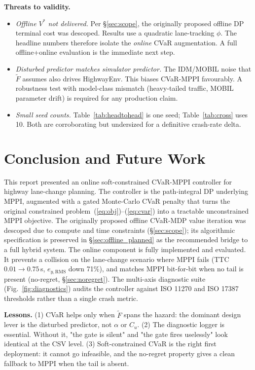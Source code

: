 \documentclass[letterpaper, 10 pt, conference]{ieeeconf}
\begin{document}
\textbf{Threats to validity.}
\begin{itemize}
    \item \textit{Offline $V^*$ not delivered.} Per \S\ref{sec:scope}, the originally proposed offline DP terminal cost was descoped. Results use a quadratic lane-tracking $\phi$. The headline numbers therefore isolate the \emph{online} CVaR augmentation. A full offline+online evaluation is the immediate next step.
    \item \textit{Disturbed predictor matches simulator predictor.} The IDM/MOBIL noise that $\tilde{F}$ assumes also drives HighwayEnv. This biases CVaR-MPPI favourably. A robustness test with model-class mismatch (heavy-tailed traffic, MOBIL parameter drift) is required for any production claim.
    \item \textit{Small seed counts.} Table~\ref{tab:headtohead} is one seed; Table~\ref{tab:cross} uses 10. Both are corroborating but undersized for a definitive crash-rate delta.
\end{itemize}

\section{Conclusion and Future Work}
\label{sec:conclusion}

This report presented an online soft-constrained CVaR-MPPI controller for highway lane-change planning. The controller is the path-integral DP underlying MPPI, augmented with a gated Monte-Carlo CVaR penalty that turns the original constrained problem~(\ref{eq:obj})--(\ref{eq:cvar}) into a tractable unconstrained MPPI objective. The originally proposed offline CVaR-MDP value iteration was descoped due to compute and time constraints (\S\ref{sec:scope}); its algorithmic specification is preserved in \S\ref{sec:offline_planned} as the recommended bridge to a full hybrid system. The online component is fully implemented and evaluated. It prevents a collision on the lane-change scenario where MPPI fails (TTC $0.01 \to 0.75$\,s, $e_{y,\mathrm{RMS}}$ down 71\%), and matches MPPI bit-for-bit when no tail is present (no-regret, \S\ref{sec:noregret}). The multi-axis diagnostic suite (Fig.~\ref{fig:diagnostics}) audits the controller against ISO 11270 and ISO 17387 thresholds rather than a single crash metric.

\textbf{Lessons.} (1) CVaR helps only when $\tilde{F}$ spans the hazard: the dominant design lever is the disturbed predictor, not $\alpha$ or $C_u$. (2) The diagnostic logger is essential. Without it, "the gate is silent" and "the gate fires uselessly" look identical at the CSV level. (3) Soft-constrained CVaR is the right first deployment: it cannot go infeasible, and the no-regret property gives a clean fallback to MPPI when the tail is absent.
\end{document}
